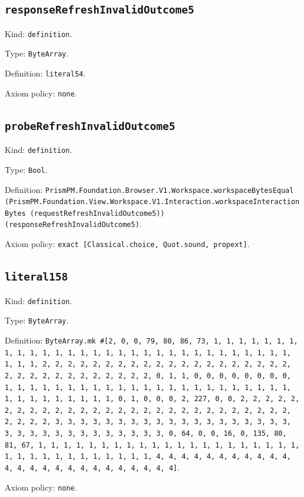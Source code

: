 \documentclass[11pt]{article}
\begin{document}
\subsection*{\texttt{responseRefreshInvalidOutcome5}}
\noindent Kind: \texttt{definition}.\par
\noindent Type: \texttt{ByteArray}.\par
\noindent Definition: \texttt{literal54}.\par
\noindent Axiom policy: \texttt{none}.\par
\subsection*{\texttt{probeRefreshInvalidOutcome5}}
\noindent Kind: \texttt{definition}.\par
\noindent Type: \texttt{Bool}.\par
\noindent Definition: \texttt{PrismPM.Foundation.Browser.V1.Workspace.workspaceBytesEqual (PrismPM.Foundation.View.Workspace.V1.Interaction.workspaceInteractionBytes (requestRefreshInvalidOutcome5)) (responseRefreshInvalidOutcome5)}.\par
\noindent Axiom policy: \texttt{exact [Classical.choice, Quot.sound, propext]}.\par
\subsection*{\texttt{literal158}}
\noindent Kind: \texttt{definition}.\par
\noindent Type: \texttt{ByteArray}.\par
\noindent Definition: \texttt{ByteArray.mk \#[2, 0, 0, 79, 80, 86, 73, 1, 1, 1, 1, 1, 1, 1, 1, 1, 1, 1, 1, 1, 1, 1, 1, 1, 1, 1, 1, 1, 1, 1, 1, 1, 1, 1, 1, 1, 1, 1, 1, 1, 2, 2, 2, 2, 2, 2, 2, 2, 2, 2, 2, 2, 2, 2, 2, 2, 2, 2, 2, 2, 2, 2, 2, 2, 2, 2, 2, 2, 2, 2, 2, 2, 0, 1, 1, 0, 0, 0, 0, 0, 0, 0, 0, 1, 1, 1, 1, 1, 1, 1, 1, 1, 1, 1, 1, 1, 1, 1, 1, 1, 1, 1, 1, 1, 1, 1, 1, 1, 1, 1, 1, 1, 1, 1, 1, 0, 1, 0, 0, 0, 2, 227, 0, 0, 2, 2, 2, 2, 2, 2, 2, 2, 2, 2, 2, 2, 2, 2, 2, 2, 2, 2, 2, 2, 2, 2, 2, 2, 2, 2, 2, 2, 2, 2, 2, 2, 3, 3, 3, 3, 3, 3, 3, 3, 3, 3, 3, 3, 3, 3, 3, 3, 3, 3, 3, 3, 3, 3, 3, 3, 3, 3, 3, 3, 3, 3, 3, 3, 0, 64, 0, 0, 16, 0, 135, 80, 81, 67, 1, 1, 1, 1, 1, 1, 1, 1, 1, 1, 1, 1, 1, 1, 1, 1, 1, 1, 1, 1, 1, 1, 1, 1, 1, 1, 1, 1, 1, 1, 1, 1, 1, 4, 4, 4, 4, 4, 4, 4, 4, 4, 4, 4, 4, 4, 4, 4, 4, 4, 4, 4, 4, 4, 4, 4, 4, 4]}.\par
\noindent Axiom policy: \texttt{none}.\par
\end{document}
